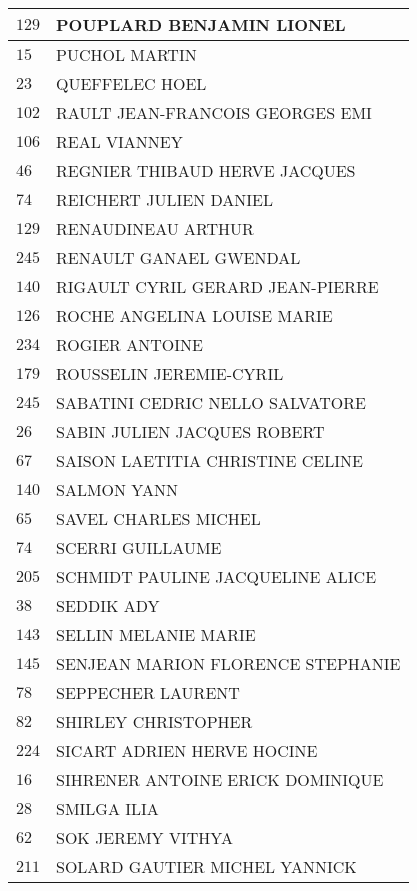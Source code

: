 \begin{xltabular}{\linewidth}{|l|X|}
    \hline
    $129$ & POUPLARD BENJAMIN LIONEL \\
    \hline
    $15$ & PUCHOL MARTIN \\
    \hline
    $23$ & QUEFFELEC HOEL \\
    \hline
    $102$ & RAULT JEAN-FRANCOIS GEORGES EMI \\
    \hline
    $106$ & REAL VIANNEY \\
    \hline
    $46$ & REGNIER THIBAUD HERVE JACQUES \\
    \hline
    $74$ & REICHERT JULIEN DANIEL \\
    \hline
    $129$ & RENAUDINEAU ARTHUR \\
    \hline
    $245$ & RENAULT GANAEL GWENDAL \\
    \hline
    $140$ & RIGAULT CYRIL GERARD JEAN-PIERRE \\
    \hline
    $126$ & ROCHE ANGELINA LOUISE MARIE \\
    \hline
    $234$ & ROGIER ANTOINE \\
    \hline
    $179$ & ROUSSELIN JEREMIE-CYRIL \\
    \hline
    $245$ & SABATINI CEDRIC NELLO SALVATORE \\
    \hline
    $26$ & SABIN JULIEN JACQUES ROBERT \\
    \hline
    $67$ & SAISON LAETITIA CHRISTINE CELINE \\
    \hline
    $140$ & SALMON YANN \\
    \hline
    $65$ & SAVEL CHARLES MICHEL \\
    \hline
    $74$ & SCERRI GUILLAUME \\
    \hline
    $205$ & SCHMIDT PAULINE JACQUELINE ALICE \\
    \hline
    $38$ & SEDDIK ADY \\
    \hline
    $143$ & SELLIN MELANIE MARIE \\
    \hline
    $145$ & SENJEAN MARION FLORENCE STEPHANIE \\
    \hline
    $78$ & SEPPECHER LAURENT \\
    \hline
    $82$ & SHIRLEY CHRISTOPHER \\
    \hline
    $224$ & SICART ADRIEN HERVE HOCINE \\
    \hline
    $16$ & SIHRENER ANTOINE ERICK DOMINIQUE \\
    \hline
    $28$ & SMILGA ILIA \\
    \hline
    $62$ & SOK JEREMY VITHYA \\
    \hline
    $211$ & SOLARD GAUTIER MICHEL YANNICK \\

\end{xltabular}
